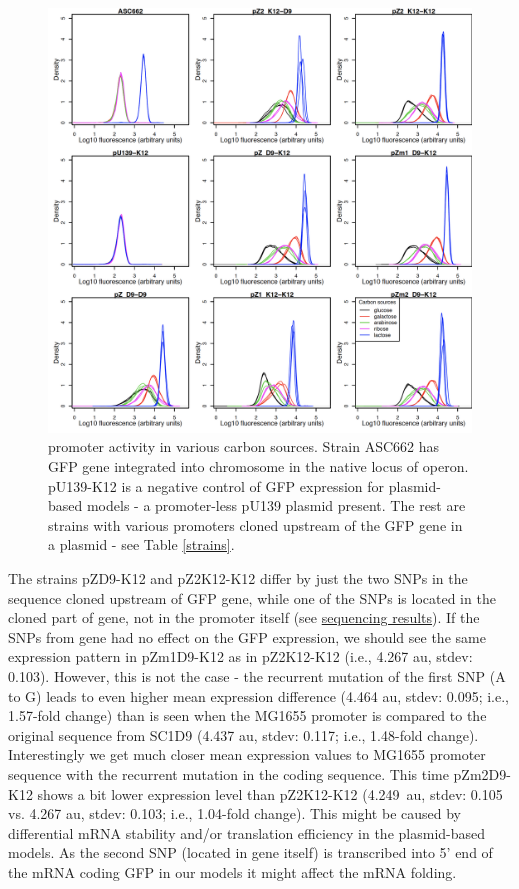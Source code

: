 \begin{figure}[ht!]
  \centering
  \includegraphics[scale=0.4]{text/Pictures/lacZassay.png}
    \caption{ promoter activity in various carbon sources. Strain ASC662 has GFP gene integrated into chromosome in the native locus of  operon. pU139-K12 is a negative control of GFP expression for plasmid-based models - a promoter-less pU139 plasmid present. The rest are strains with various  promoters cloned upstream of the GFP gene in a plasmid - see Table \ref{strains}.}
    \label{lacZassay}
\end{figure}

The strains pZ\textunderscore D9-K12 and pZ2\textunderscore K12-K12 differ by just the two SNPs in the sequence cloned upstream of GFP gene, while one of the SNPs is located in the cloned part of  gene, not in the promoter itself (see \hyperlink{SeqRes}{sequencing results}).
If the SNPs from  gene had no effect on the GFP expression, we should see the same expression pattern in pZm1\textunderscore D9-K12 as in pZ2\textunderscore K12-K12 (i.e., 4.267 au, stdev: 0.103).
However, this is not the case - the recurrent mutation of the first SNP (A to G) leads to even higher mean expression difference (4.464 au, stdev: 0.095; i.e., 1.57-fold change) than is seen when the MG1655 promoter is compared to the original sequence from SC1\textunderscore D9 (4.437 au, stdev: 0.117; i.e., 1.48-fold change).
Interestingly we get much closer mean expression values to MG1655 promoter sequence with the recurrent mutation in the  coding sequence.
This time pZm2\textunderscore D9-K12 shows a bit lower expression level than pZ2\textunderscore K12-K12 (4.249~au, stdev: 0.105 vs. 4.267 au, stdev: 0.103; i.e., 1.04-fold change).
This might be caused by differential mRNA stability and/or translation efficiency in the plasmid-based models.
As the second SNP (located in  gene itself) is transcribed into 5' end of the mRNA coding GFP in our models it might affect the mRNA folding.

